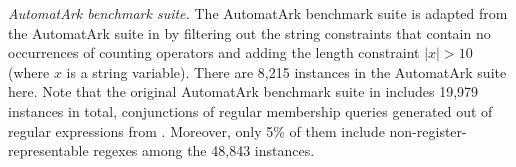 \medskip
\noindent
\emph{AutomatArk benchmark suite.}
The AutomatArk benchmark suite is adapted from the AutomatArk suite in \cite{z3str3re} by filtering out the string constraints that contain no occurrences of counting operators and adding the length constraint $|x| > 10$ (where $x$ is a string variable). There are 8,215 instances in the AutomatArk suite here.
Note that the original AutomatArk benchmark suite in \cite{z3str3re} includes 19,979 instances in total, conjunctions of regular membership queries generated out of regular expressions from \cite{automatark}.
Moreover, only 5\% of them include non-register-representable regexes among the 48,843 instances.

